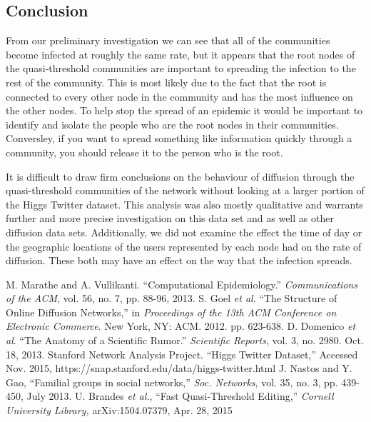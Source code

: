 \documentclass[12pt, oneside, openany]{article} %
\begin{document}
\subsection{Conclusion}
From our preliminary investigation we can see that all of the communities become infected at roughly the same rate, but it appears that the root nodes of the quasi-threshold communities are important to spreading the infection to the rest of the community. This is most likely due to the fact that the root is connected to every other node in the community and has the most influence on the other nodes. To help stop the spread of an epidemic it would be important to identify and isolate the people who are the root nodes in their communities. Conversley, if you want to spread something like information quickly through a community, you should release it to the person who is the root. 

It is difficult to draw firm conclusions on the behaviour of diffusion through the quasi-threshold communities of the network without looking at a larger portion of the Higgs Twitter dataset. This analysis was also mostly qualitative and warrants further and more precise investigation on this data set and as well as other diffusion data sets. Additionally, we did not examine the effect the time of day or the geographic locations of the users represented by each node had on the rate of diffusion. These both may have an effect on the way that the infection spreads.

\newpage
\begin{thebibliography}{1}
 M. Marathe and A. Vullikanti. ``Computational Epidemiology.'' \emph{Communications of the ACM}, vol. 56, no. 7, pp. 88-96, 2013.
 S. Goel \emph{et al}. ``The Structure of Online Diffusion Networks,'' in \emph{Proceedings of the 13th ACM Conference on Electronic Commerce}. New York, NY: ACM. 2012. pp. 623-638.
 D. Domenico \emph{et al}. ``The Anatomy of a Scientific Rumor.'' \emph{Scientific Reports}, vol. 3, no. 2980. Oct. 18, 2013.
Stanford Network Analysis Project. ``Higgs Twitter Dataset,'' Accessed Nov. 2015, https://snap.stanford.edu/data/higgs-twitter.html
J. Nastos and Y. Gao, ``Familial groups in social networks,'' \emph{Soc. Networks}, vol. 35, no. 3, pp. 439-450, July 2013.
U. Brandes \emph{et al.}, ``Fast Quasi-Threshold Editing,'' \emph{Cornell University Library,} arXiv:1504.07379, Apr. 28, 2015
 \end{thebibliography}
\end{document}

